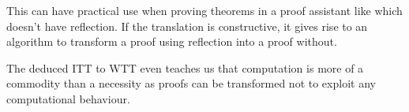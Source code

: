 This can have practical use when proving theorems in a proof assistant like \Coq
which doesn't have reflection. If the translation is constructive, it gives
rise to an algorithm to transform a proof using reflection into a proof without.

The deduced \acrshort{ITT} to \acrshort{WTT} even teaches us that computation
is more of a commodity than a necessity as proofs can be transformed not to
exploit any computational behaviour.